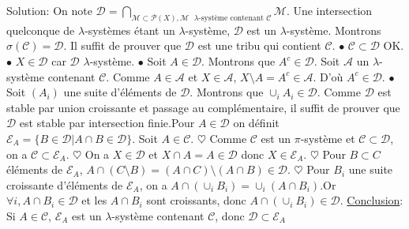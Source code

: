 \documentclass{report}
\begin{document}
Solution: On note $\displaystyle \mathcal D = \bigcap_{\mathcal M\subset \mathcal P(X), \mathcal M\text{ $\lambda$-système contenant $\mathcal C$}} \mathcal M$. \newline Une intersection quelconque de $\lambda$-systèmes étant un $\lambda$-système, $\mathcal D$ est un $\lambda$-système.\newline
Montrons $\sigma(\mathcal C) = \mathcal D$.\newline
\fbox{$\subset$} Il suffit de prouver que $\mathcal D$ est une tribu qui contient $\mathcal C$.\newline
$\bullet$ $\mathcal C \subset \mathcal D$   \quad OK.\newline 
$\bullet$ $X\in \mathcal D$ car $\mathcal D$ $\lambda$-système.\newline 
$\bullet$ Soit $A\in \mathcal D$. Montrons que $A^c\in \mathcal D$.\newline
Soit $\mathcal A$ un $\lambda$-système contenant $\mathcal C$. Comme $A\in \mathcal A$ et $X\in \mathcal A$, $X\setminus A = A^c\in \mathcal A$. D'où $A^c\in \mathcal D$.\newline
$\bullet$ Soit $(A_i)$ une suite d'éléments de $\mathcal D$. Montrons que $\cup_i A_i\in \mathcal D$. Comme $\mathcal D$ est stable par union croissante et passage au complémentaire,  il suffit de prouver que $\mathcal D$ est stable par intersection finie.\newline \newline Pour $A\in \mathcal D$ on définit $\mathcal E_A = \{B\in \mathcal D | A\cap B \in \mathcal D\}$.\newline
Soit $A\in \mathcal C$. \newline
$\heartsuit$ Comme $\mathcal C$ est un $\pi$-système et $\mathcal C \subset \mathcal D$, on a $\mathcal C \subset \mathcal E_A$. \newline
$\heartsuit$ On a $X\in \mathcal D$ et $X\cap A = A\in \mathcal D$ donc $X\in \mathcal E_A$. \newline
$\heartsuit$ Pour $B\subset C$ éléments de $\mathcal E_A$, $A\cap (C\setminus B) = (A\cap C)\setminus (A\cap B) \in \mathcal D$.\newline
$\heartsuit$ Pour $B_i$ une suite croissante d'éléments de $\mathcal E_A$, on a $A\cap (\cup_i B_i) = \cup_i (A\cap B_i)$.\newline Or $\forall i, A\cap B_i\in \mathcal D$ et les $A\cap B_i$ sont croissants, donc $A\cap (\cup_i B_i) \in \mathcal D$.\newline
\underline{Conclusion}: Si $A\in \mathcal C$,  $\mathcal E_A$ est un $\lambda$-système contenant $\mathcal C$, donc $\mathcal D \subset \mathcal E_A$ \newline \newline
\end{document}
